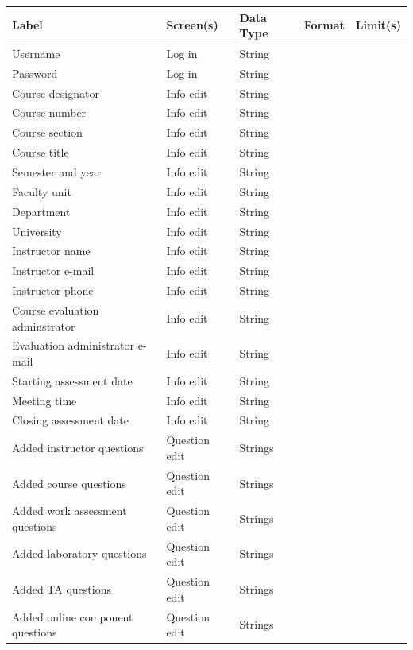 \documentclass{article}
\begin{document}
\begin{center}
\begin{tabular}{|p{4.4cm}|p{2.2cm}|p{2cm}|p{4cm}|p{4cm}|} 
\hline
\textbf{Label} & \textbf{Screen(s)} & \textbf{Data Type} & \textbf{Format} & \textbf{Limit(s)} \\
\hline
Username & Log in & String & & \\ 
\hline
Password & Log in & String & & \\ 
\hline
Course designator & Info edit & String & & \\ 
\hline
Course number & Info edit & String & & \\ 
\hline
Course section & Info edit & String & & \\ 
\hline
Course title & Info edit & String & & \\ 
\hline
Semester and year & Info edit & String & & \\ 
\hline
Faculty unit & Info edit & String & & \\ 
\hline
Department & Info edit & String & & \\ 
\hline
University & Info edit & String & & \\ 
\hline
Instructor name & Info edit & String & & \\ 
\hline
Instructor e-mail & Info edit & String & & \\ 
\hline
Instructor phone & Info edit & String & & \\ 
\hline
Course evaluation adminstrator & Info edit & String & & \\ 
\hline
Evaluation administrator e-mail & Info edit & String & & \\ 
\hline
Starting assessment date & Info edit & String & & \\ 
\hline
Meeting time & Info edit & String & & \\ 
\hline
Closing assessment date & Info edit & String & & \\ 
\hline
Added instructor questions & Question edit & Strings & & \\ 
\hline
Added course questions & Question edit & Strings & & \\ 
\hline
Added work assessment questions & Question edit & Strings & & \\ 
\hline
Added laboratory questions & Question edit & Strings & & \\ 
\hline
Added TA questions & Question edit & Strings & & \\ 
\hline
Added online component questions & Question edit & Strings & & \\ 

\end{tabular}
\end{center}
\end{document}

